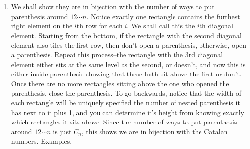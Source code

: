 \documentclass[12pt]{article}
\theoremstyle{definition}
\theoremstyle{remark}
\begin{document}
\begin{enumerate}[leftmargin=\labelsep]
		\item We shall show they are in bijection with the number of ways to put parenthesis around $12\cdots n$. Notice exactly one rectangle contains the furthest right element on the $i$th row for each $i$. We shall call this the $i$th diagonal element. Starting from the bottom, if the rectangle with the second diagonal element also tiles the first row, then don't open a parenthesis, otherwise, open a parenthesis. Repeat this process--the rectangle with the 3rd diagonal element either sits at the same level as the second, or doesn't, and now this is either inside parenthesis showing that these both sit above the first or don't. Once there are no more rectangles sitting above the one who opened the parenthesis, close the parenthesis. To go backwards, notice that the width of each rectangle will be uniquely specified the number of nested parenthesis it has next to it plus 1, and you can determine it's height from knowing exactly which rectangles it sits above. Since the number of ways to put parenthesis around $12 \cdots n$ is just $C_n$, this shows we are in bijection with the Catalan numbers. Examples.
		
		
	\end{enumerate}
\end{document}
